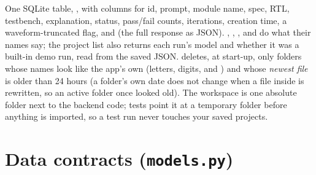 One SQLite table, , with columns for id, prompt, module name, spec, RTL, testbench, explanation, status, pass/fail counts, iterations, creation time, a waveform-truncated flag, and  (the full response as JSON). , , ,  and  do what their names say; the project list also returns each run's model and whether it was a built-in demo run, read from the saved JSON.  deletes, at start-up, only folders whose names look like the app's own (letters, digits, \code{_} and \code{-}) and whose \emph{newest file} is older than 24 hours (a folder's own date does not change when a file inside is rewritten, so an active folder once looked old). The workspace is one absolute folder next to the backend code; tests point it at a temporary folder before anything is imported, so a test run never touches your saved projects.

\section{Data contracts (\texttt{models.py})}

